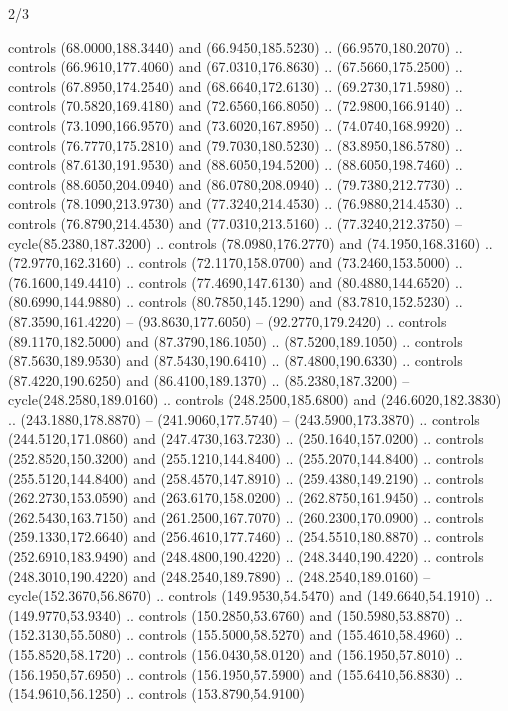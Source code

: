 \begin{flagdescription}{2/3}
\begin{scope}[xshift=0.5\flaglength,yshift=0.5\flagwidth,scale=\stretchfactor]
\begin{scope}[scale=0.001645\flagwidth,yshift=65mm,xshift=-63mm]
\begin{scope}[y=0.80pt, x=0.80pt, yscale=-1,]
\begin{scope}[cm={{1.33333,0.0,0.0,1.33333,(0.0,1e-05)}}]
  controls (68.0000,188.3440) and (66.9450,185.5230) .. (66.9570,180.2070) ..
  controls (66.9610,177.4060) and (67.0310,176.8630) .. (67.5660,175.2500) ..
  controls (67.8950,174.2540) and (68.6640,172.6130) .. (69.2730,171.5980) ..
  controls (70.5820,169.4180) and (72.6560,166.8050) .. (72.9800,166.9140) ..
  controls (73.1090,166.9570) and (73.6020,167.8950) .. (74.0740,168.9920) ..
  controls (76.7770,175.2810) and (79.7030,180.5230) .. (83.8950,186.5780) ..
  controls (87.6130,191.9530) and (88.6050,194.5200) .. (88.6050,198.7460) ..
  controls (88.6050,204.0940) and (86.0780,208.0940) .. (79.7380,212.7730) ..
  controls (78.1090,213.9730) and (77.3240,214.4530) .. (76.9880,214.4530) ..
  controls (76.8790,214.4530) and (77.0310,213.5160) .. (77.3240,212.3750) --
  cycle(85.2380,187.3200) .. controls (78.0980,176.2770) and (74.1950,168.3160)
  .. (72.9770,162.3160) .. controls (72.1170,158.0700) and (73.2460,153.5000) ..
  (76.1600,149.4410) .. controls (77.4690,147.6130) and (80.4880,144.6520) ..
  (80.6990,144.9880) .. controls (80.7850,145.1290) and (83.7810,152.5230) ..
  (87.3590,161.4220) -- (93.8630,177.6050) -- (92.2770,179.2420) .. controls
  (89.1170,182.5000) and (87.3790,186.1050) .. (87.5200,189.1050) .. controls
  (87.5630,189.9530) and (87.5430,190.6410) .. (87.4800,190.6330) .. controls
  (87.4220,190.6250) and (86.4100,189.1370) .. (85.2380,187.3200) --
  cycle(248.2580,189.0160) .. controls (248.2500,185.6800) and
  (246.6020,182.3830) .. (243.1880,178.8870) -- (241.9060,177.5740) --
  (243.5900,173.3870) .. controls (244.5120,171.0860) and (247.4730,163.7230) ..
  (250.1640,157.0200) .. controls (252.8520,150.3200) and (255.1210,144.8400) ..
  (255.2070,144.8400) .. controls (255.5120,144.8400) and (258.4570,147.8910) ..
  (259.4380,149.2190) .. controls (262.2730,153.0590) and (263.6170,158.0200) ..
  (262.8750,161.9450) .. controls (262.5430,163.7150) and (261.2500,167.7070) ..
  (260.2300,170.0900) .. controls (259.1330,172.6640) and (256.4610,177.7460) ..
  (254.5510,180.8870) .. controls (252.6910,183.9490) and (248.4800,190.4220) ..
  (248.3440,190.4220) .. controls (248.3010,190.4220) and (248.2540,189.7890) ..
  (248.2540,189.0160) -- cycle(152.3670,56.8670) .. controls (149.9530,54.5470)
  and (149.6640,54.1910) .. (149.9770,53.9340) .. controls (150.2850,53.6760)
  and (150.5980,53.8870) .. (152.3130,55.5080) .. controls (155.5000,58.5270)
  and (155.4610,58.4960) .. (155.8520,58.1720) .. controls (156.0430,58.0120)
  and (156.1950,57.8010) .. (156.1950,57.6950) .. controls (156.1950,57.5900)
  and (155.6410,56.8830) .. (154.9610,56.1250) .. controls (153.8790,54.9100)

\end{scope}
\end{scope}
\end{scope}
\end{scope}
\end{flagdescription}
